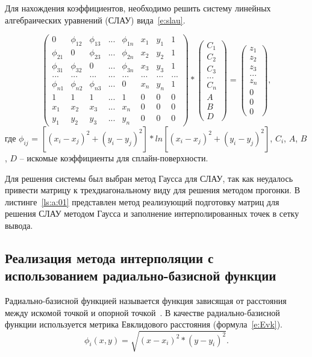 Для нахождения коэффициентов, необходимо решить систему линейных алгебраических уравнений (СЛАУ) вида~\ref{e:slau}. 

\begin{equation} \label{e:slau}
\begin{pmatrix}
 0 &  \phi_{12} & \phi_{13} & ... & \phi_{1n} & x_1 & y_1 & 1 \\ 
 \phi_{21} & 0 & \phi_{23} & ... & \phi_{2n} & x_2 & y_2 & 1 \\ 
 \phi_{31} & \phi_{32} & 0 & ... & \phi_{3n} & x_3 & y_3 & 1 \\ 
 ... & ... & ... & ... & ... & ... & ... & ... \\ 
 \phi_{n1} & \phi_{n2} & \phi_{n3} & ... & 0 & x_n & y_n & 1 \\ 
 1 & 1 & 1 & ... & 1 & 0 & 0 & 0 \\ 
 x_1 & x_2 & x_3 & ... & x_n & 0 & 0 & 0\\ 
 y_1 & y_2 & y_3 & ... & y_n & 0 & 0 & 0
\end{pmatrix} * \begin{pmatrix}
C_1\\ 
C_2\\ 
C_3\\ 
...\\ 
C_n\\ 
A\\ 
B\\ 
D
\end{pmatrix} = \begin{pmatrix}
z_1\\ 
z_2\\ 
z_3\\ 
...\\ 
z_n\\ 
0\\ 
0\\ 
0
\end{pmatrix},
\end{equation}
где $\phi_{ij}$ = $[(x_i - x_j)^2 + (y_i - y_j)^2] * ln[(x_i - x_j)^2 + (y_i - y_j)^2]$, $C_i$, $A$, $B$, $D$ -- искомые коэффициенты для сплайн-поверхности.

Для решения системы был выбран метод Гаусса для СЛАУ, так как неудалось привести матрицу к трехдиагональному виду для решения методом прогонки. В листинге~\ref{ls:a:01} представлен метод реализующий подготовку матриц для решения СЛАУ методом Гаусса и заполнение интерполированных точек в сетку вывода.


\subsection{Реализация метода интерполяции с использованием радиально-базисной функции }
Радиально-базисной функцией называется функция зависящая от расстояния между искомой точкой и опорной точкой~\cite{27}. В качестве радиально-базисной функции используется метрика Евклидового расстояния (формула~\ref{e:Evk}). 
\begin{equation} \label{e:Evk}
\phi_i(x,y) = \sqrt{(x-x_i)^2 * (y-y_i)^2}.
\end{equation}

